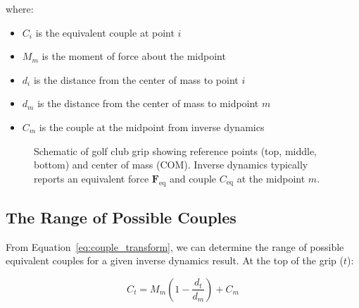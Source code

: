 \documentclass[11pt,a4paper]{article}
\newcommand{\bvec}[1]{\mathbf{#1}}
\newcommand{\Feq}{\bvec{F}_{\text{eq}}}
\newcommand{\Ceq}{C_{\text{eq}}}
\begin{document}
where:
\begin{itemize}
    \item $C_i$ is the equivalent couple at point $i$
    \item $M_m$ is the moment of force about the midpoint
    \item $d_i$ is the distance from the center of mass to point $i$
    \item $d_m$ is the distance from the center of mass to midpoint $m$
    \item $C_m$ is the couple at the midpoint from inverse dynamics
\end{itemize}

\begin{figure}[ht]
\centering
{}
\caption{Schematic of golf club grip showing reference points (top, middle, bottom) and center of mass (COM). Inverse dynamics typically reports an equivalent force $\Feq$ and couple $\Ceq$ at the midpoint $m$.}
\label{fig:grip_schematic}
\end{figure}

\subsection{The Range of Possible Couples}

From Equation~\ref{eq:couple_transform}, we can determine the range of possible equivalent couples for a given inverse dynamics result. At the top of the grip ($t$):

\begin{equation}
C_t = M_m \left(1 - \frac{d_t}{d_m}\right) + C_m
\end{equation}
\end{document}
